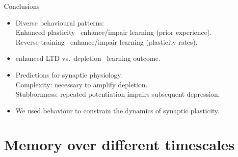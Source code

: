 \documentclass[final]{beamer}%
\begin{document}
\begin{frame}{Conclusions}
%
 \begin{itemize}
   \item Diverse behavioural patterns:\\
   \alert{Enhanced plasticity \lto\ enhance/impair} learning (prior experience).\\
   \alert{Reverse-training \lto\ enhance/impair} learning (plasticity rates).

   \item \alert{enhanced LTD} vs.\ \alert{depletion} \lto\ learning outcome.
    \hfill{} {}



   \item Predictions for synaptic physiology:\\
   \alert{Complexity:} necessary to amplify depletion.\\
   \alert{Stubbornness:} repeated potentiation impairs subsequent depression.

   \vp\item  We used behaviour to constrain the dynamics of synaptic plasticity.
\end{itemize}
%
\end{frame}



\section{Memory over different timescales}

\end{document}
